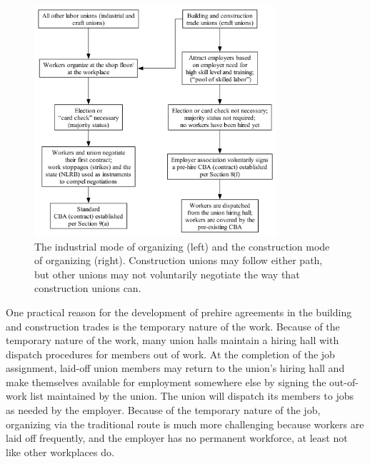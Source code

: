 \documentclass[12pt]{article}
\newcommand{\imageWidth}{0.8\textwidth}
\begin{document}
\begin{figure}[ht]
  \centering
  \includegraphics[width=\imageWidth]{images/organizing_paths}
  \captionsetup{justification=centering, singlelinecheck=false, margin=2cm}
  \caption[Union Organizing Paths]{The industrial mode of organizing (left) and the construction mode of organizing (right). Construction unions may follow either path, but other unions may not voluntarily negotiate the way that construction unions can.}
  \label{fig:organizing_paths}
\end{figure}

One practical reason for the development of prehire agreements in the building and construction trades is the temporary nature of the work. Because of the temporary nature of the work, many union halls maintain a hiring hall with dispatch procedures for members out of work. At the completion of the job assignment, laid-off union members may return to the union’s hiring hall and make themselves available for employment somewhere else by signing the out-of-work list maintained by the union. The union will dispatch its members to jobs as needed by the employer. Because of the temporary nature of the job, organizing via the traditional route is much more challenging because workers are laid off frequently, and the employer has no permanent workforce, at least not like other workplaces do. 
\end{document}
